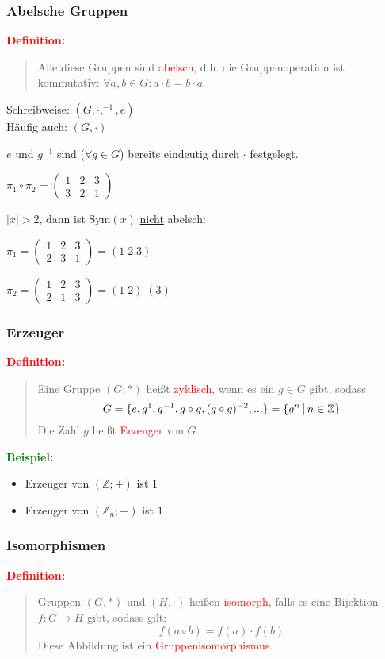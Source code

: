 \documentclass{article}
\newcommand{\smsp}{\phantom{\hspace{3px}}}
\newcommand{\red}[1]{\textcolor{red}{#1}}
\newcommand{\green}[1]{\textcolor{green}{#1}}
\newcommand{\ex}{\green{\textbf{Beispiel: }}}
\newcommand{\de}[1]{\red{\textbf{Definition: }}\begin{quote}#1\end{quote}}
\newcommand{\Z}{\mathbb{Z}}
\newcommand{\vst}{\smsp \vline \smsp}
\begin{document}
\subsubsection{Abelsche Gruppen}
\de{
    Alle diese Gruppen sind \red{abelsch}, d.h. die Gruppenoperation ist kommutativ: $\forall a,b \in G: a \cdot b = b \cdot a$
}

Schreibweise: $(G, \cdot, ^{-1}, e)$\\
Häufig auch: $(G, \cdot)$

$e$ und $g^{-1}$ sind ($\forall g \in G$) bereits eindeutig durch $\cdot$ festgelegt.

$\pi_1 \circ \pi_2 = \begin{pmatrix}
    1 & 2 & 3\\
    3 & 2 & 1
\end{pmatrix}$


$|x| > 2$, dann ist Sym$(x)$ \underline{nicht} abelsch:

$\pi_1 = \begin{pmatrix}
    1 & 2 & 3\\
    2 & 3 & 1
\end{pmatrix} 
= (1 \; 2 \; 3)$

$\pi_2 = \begin{pmatrix}
    1 & 2 & 3\\
    2 & 1 & 3
\end{pmatrix} 
= (1 \; 2) \; (3)$

\subsubsection{Erzeuger}
\de{
    Eine Gruppe $(G; *)$ heißt \red{zyklisch}, wenn es ein $g \in G$ gibt, sodass
    $$G = \{e, g^1, g^{-1}, g \circ g, (g \circ g)^{-2}, ...\} = \{g^n \vst n \in \Z\}$$
    Die Zahl $g$ heißt \red{Erzeuger} von $G$.
}

\ex \begin{itemize}
    \item Erzeuger von $(\Z; +)$ ist $1$
    \item Erzeuger von $(\Z_n; +)$ ist $1$
\end{itemize}

\subsubsection{Isomorphismen}
\de{
    Gruppen $(G, *)$ und $(H, \cdot)$ heißen \red{isomorph}, falls es eine Bijektion $f: G \to H$ gibt, sodass gilt:
    $$f(a \circ b) = f(a) \cdot f(b)$$
    Diese Abbildung ist ein \red{Gruppenisomorphismus}.
}
\end{document}
